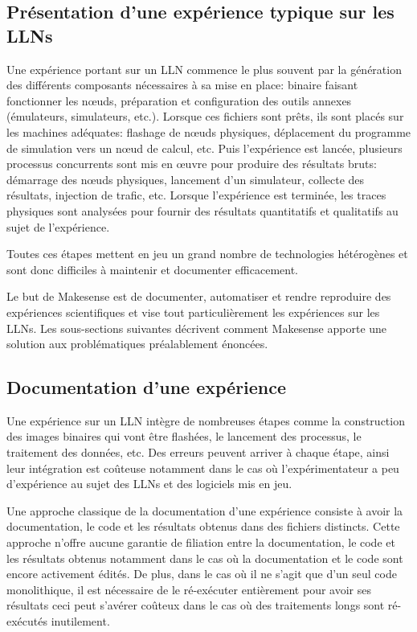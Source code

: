 \subsection{Présentation d'une expérience typique sur les \ac{LLN}s}

Une expérience portant sur un \ac{LLN} commence le plus souvent par la génération des différents composants nécessaires à sa mise en place: binaire faisant fonctionner les nœuds, préparation et configuration des outils annexes (émulateurs, simulateurs, etc.).
Lorsque ces fichiers sont prêts, ils sont placés sur les machines adéquates: flashage de nœuds physiques, déplacement du programme de simulation vers un nœud de calcul, etc.
Puis l'expérience est lancée, plusieurs processus concurrents sont mis en œuvre pour produire des résultats bruts: démarrage des nœuds physiques, lancement d'un simulateur, collecte des résultats, injection de trafic, etc.
Lorsque l'expérience est terminée, les traces physiques sont analysées pour fournir des résultats quantitatifs et qualitatifs au sujet de l'expérience.

Toutes ces étapes mettent en jeu un grand nombre de technologies hétérogènes et sont donc difficiles à maintenir et documenter efficacement.

Le but de Makesense est de documenter, automatiser et rendre reproduire des expériences scientifiques et vise tout particulièrement les expériences sur les \ac{LLN}s.
Les sous-sections suivantes décrivent comment Makesense apporte une solution aux problématiques préalablement énoncées.

\subsection{Documentation d'une expérience}

Une expérience sur un \ac{LLN} intègre de nombreuses étapes comme la construction des images binaires qui vont être flashées, le lancement des processus, le traitement des données, etc.
Des erreurs peuvent arriver à chaque étape, ainsi leur intégration est coûteuse notamment dans le cas où l'expérimentateur a peu d'expérience au sujet des \ac{LLN}s et des logiciels mis en jeu.

Une approche classique de la documentation d'une expérience consiste à avoir la documentation, le code et les résultats obtenus dans des fichiers distincts.
Cette approche n'offre aucune garantie de filiation entre la documentation, le code et les résultats obtenus notamment dans le cas où la documentation et le code sont encore activement édités.
De plus, dans le cas où il ne s'agit que d'un seul code monolithique, il est nécessaire de le ré-exécuter entièrement pour avoir ses résultats ceci peut s'avérer coûteux dans le cas où des traitements longs sont ré-exécutés inutilement.

